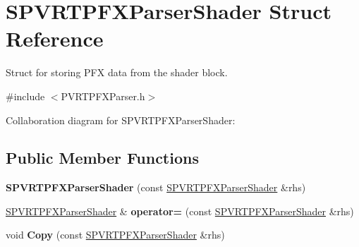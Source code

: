 \hypertarget{struct_s_p_v_r_t_p_f_x_parser_shader}{\section{S\+P\+V\+R\+T\+P\+F\+X\+Parser\+Shader Struct Reference}
\label{struct_s_p_v_r_t_p_f_x_parser_shader}
}


Struct for storing P\+F\+X data from the shader block.  




{\ttfamily \#include $<$P\+V\+R\+T\+P\+F\+X\+Parser.\+h$>$}



Collaboration diagram for S\+P\+V\+R\+T\+P\+F\+X\+Parser\+Shader\+:
\subsection*{Public Member Functions}
\begin{DoxyCompactItemize}
\item 
\hypertarget{struct_s_p_v_r_t_p_f_x_parser_shader_acc4a41e96dc5f2033ec8acc4db36046c}{{\bfseries S\+P\+V\+R\+T\+P\+F\+X\+Parser\+Shader} (const \hyperlink{struct_s_p_v_r_t_p_f_x_parser_shader}{S\+P\+V\+R\+T\+P\+F\+X\+Parser\+Shader} \&rhs)}\label{struct_s_p_v_r_t_p_f_x_parser_shader_acc4a41e96dc5f2033ec8acc4db36046c}

\item 
\hypertarget{struct_s_p_v_r_t_p_f_x_parser_shader_ad14db7381bed9ee96fb0376ee8d4eef2}{\hyperlink{struct_s_p_v_r_t_p_f_x_parser_shader}{S\+P\+V\+R\+T\+P\+F\+X\+Parser\+Shader} \& {\bfseries operator=} (const \hyperlink{struct_s_p_v_r_t_p_f_x_parser_shader}{S\+P\+V\+R\+T\+P\+F\+X\+Parser\+Shader} \&rhs)}\label{struct_s_p_v_r_t_p_f_x_parser_shader_ad14db7381bed9ee96fb0376ee8d4eef2}

\item 
\hypertarget{struct_s_p_v_r_t_p_f_x_parser_shader_a8fd6313e2e880ef1d676f18c3cbbb5e7}{void {\bfseries Copy} (const \hyperlink{struct_s_p_v_r_t_p_f_x_parser_shader}{S\+P\+V\+R\+T\+P\+F\+X\+Parser\+Shader} \&rhs)}\label{struct_s_p_v_r_t_p_f_x_parser_shader_a8fd6313e2e880ef1d676f18c3cbbb5e7}

\end{DoxyCompactItemize}
